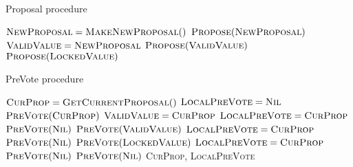 \begin{algorithm}[p]
\caption{Proposal procedure}
\label{alg:proposal_proc}
\begin{algorithmic}[1]
            \State $\textsc{NewProposal} = \textsc{MakeNewProposal}()$
            \State $\textsc{Propose}(\textsc{NewProposal})$
            \State $\textsc{ValidValue} = \textsc{NewProposal}$
            \State $\textsc{Propose}(\textsc{ValidValue})$
        \Else
            \State $\textsc{Propose}(\textsc{LockedValue})$
        \EndIf
    \EndIf
    \State \Return
\EndFunction
\end{algorithmic}
\end{algorithm}

\begin{algorithm}[p]
\caption{PreVote procedure}
\label{alg:prevote_proc}
\begin{algorithmic}[1]
    \State $\textsc{CurProp} = \textsc{GetCurrentProposal}()$
    \State $\textsc{LocalPreVote} = \textsc{Nil}$
                \State $\textsc{PreVote}(\textsc{CurProp})$
                \State $\textsc{ValidValue} = \textsc{CurProp}$
                \State $\textsc{LocalPreVote} = \textsc{CurProp}$
            \Else
                \State $\textsc{PreVote}(\textsc{Nil})$
            \EndIf
                \State $\textsc{PreVote}(\textsc{ValidValue})$
                \State $\textsc{LocalPreVote} = \textsc{CurProp}$
            \Else
                \State $\textsc{PreVote}(\textsc{Nil})$
            \EndIf
        \Else
                \State $\textsc{PreVote}(\textsc{LockedValue})$
                \State $\textsc{LocalPreVote} = \textsc{CurProp}$
            \Else
                \State $\textsc{PreVote}(\textsc{Nil})$
            \EndIf
        \EndIf
    \Else
        \State $\textsc{PreVote}(\textsc{Nil})$
    \EndIf
    \State \Return \textsc{CurProp}, \textsc{LocalPreVote}
\EndFunction
\end{algorithmic}
\end{algorithm}

